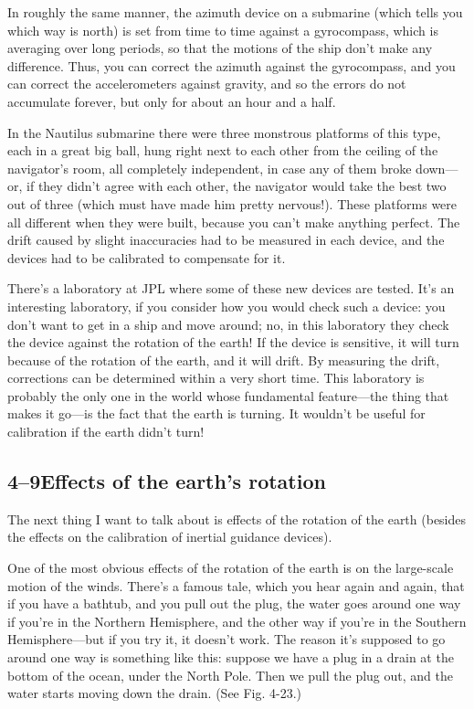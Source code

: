 \documentclass[11pt,oneside]{article}
\begin{document}
In roughly the same manner, the azimuth device on a submarine (which tells you which way is north) is set from time to time against a gyrocompass, which is averaging over long periods, so that the motions of the ship don't make any difference. Thus, you can correct the azimuth against the gyrocompass, and you can correct the accelerometers against gravity, and so the errors do not accumulate forever, but only for about an hour and a half.\par

In the Nautilus submarine there were three monstrous platforms of this type, each in a great big ball, hung right next to each other from the ceiling of the navigator's room, all completely independent, in case any of them broke down---or, if they didn't agree with each other, the navigator would take the best two out of three (which must have made him pretty nervous!). These platforms were all different when they were built, because you can't make anything perfect. The drift caused by slight inaccuracies had to be measured in each device, and the devices had to be calibrated to compensate for it.\par

There's a laboratory at JPL where some of these new devices are tested. It's an interesting laboratory, if you consider how you would check such a device: you don't want to get in a ship and move around; no, in this laboratory they check the device against the rotation of the earth! If the device is sensitive, it will turn because of the rotation of the earth, and it will drift. By measuring the drift, corrections can be determined within a very short time. This laboratory is probably the only one in the world whose fundamental feature---the thing that makes it go---is the fact that the earth is turning. It wouldn't be useful for calibration if the earth didn't turn!\par

\subsection*{4--9Effects of the earth's rotation}

The next thing I want to talk about is effects of the rotation of the earth (besides the effects on the calibration of inertial guidance devices).\par

One of the most obvious effects of the rotation of the earth is on the large-scale motion of the winds. There's a famous tale, which you hear again and again, that if you have a bathtub, and you pull out the plug, the water goes around one way if you're in the Northern Hemisphere, and the other way if you're in the Southern Hemisphere---but if you try it, it doesn't work. The reason it's supposed to go around one way is something like this: suppose we have a plug in a drain at the bottom of the ocean, under the North Pole. Then we pull the plug out, and the water starts moving down the drain. (See Fig. 4-23.)\par
\end{document}
